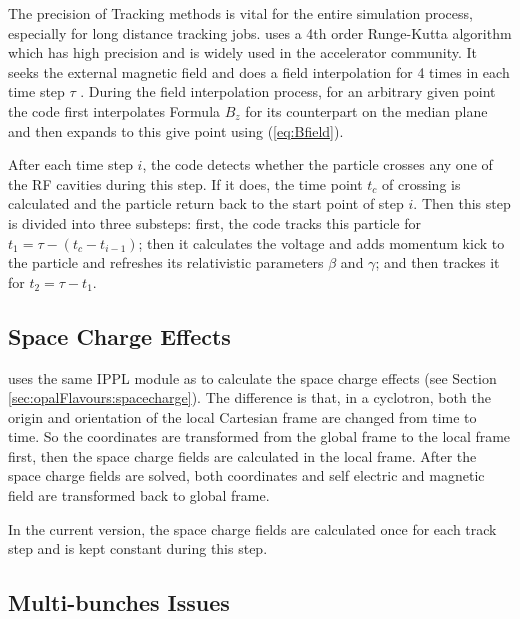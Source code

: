 The precision of Tracking methods is vital for the entire simulation process, especially for long distance tracking jobs.
\opalcycl uses a 4th order Runge-Kutta algorithm which has high precision and is widely used in the accelerator 
community. It seeks the external magnetic field and does a field interpolation for 4 times in each time step $\tau$ .
During the field interpolation process, for an arbitrary given point the code first interpolates Formula $B_z$
for its counterpart on the median plane and then expands to this give point using (\ref{eq:Bfield}). 

After each time step $i$, the code detects whether the particle crosses any one of the RF cavities during this step.
If it does, the time point $t_c$ of crossing is calculated and the particle return back to the start point of 
step $i$. Then this step is divided into three substeps:
first, the code tracks this particle for $ t_1 = \tau - (t_c-t_{i-1})$;
then it calculates the voltage and adds momentum kick to the particle and refreshes its relativistic parameters $\beta$ and $\gamma$; 
and then trackes it for $t_2 = \tau - t_1$. 

\subsection{Space Charge Effects}  

\opalcycl uses the same IPPL module as \opalt to calculate the space charge effects (see Section \ref{sec:opalFlavours:spacecharge}).
The difference is that, in a cyclotron,
both the origin and orientation of the local Cartesian frame are changed from time to time. So the coordinates are transformed from 
the global frame to the local frame first, then the space charge fields are calculated in the local frame. 
After the space charge fields are solved, both coordinates and self electric and magnetic field are transformed back to global frame.
 
In the current version, the space charge fields are calculated once for each track step and is kept constant during this step.      

\subsection{Multi-bunches Issues}
\label{sec:opalcycl:MultiBunch}
				   
